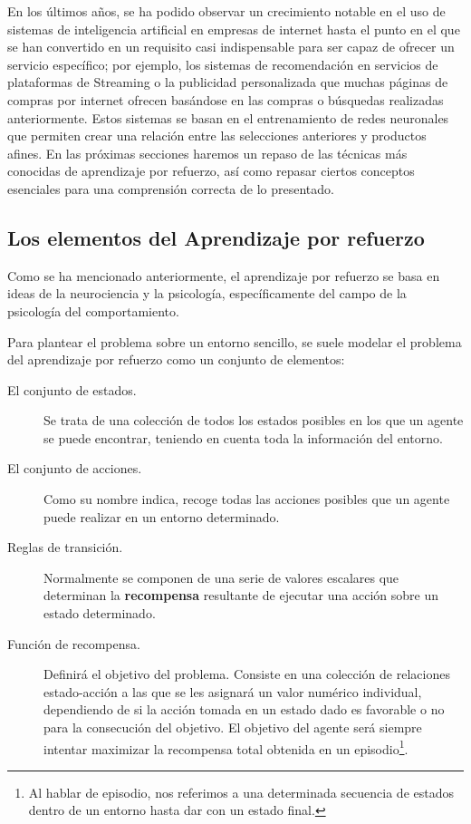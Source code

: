 \documentclass[11pt,spanish,listoffigures,listoftables]{tfgetsinf}
\begin{document}
En los últimos años, se ha podido observar un crecimiento notable en el uso de sistemas de inteligencia artificial en empresas de internet hasta el punto en el que se han convertido en un requisito casi indispensable para ser capaz de ofrecer un servicio específico; por ejemplo, los sistemas de recomendación en servicios de plataformas de Streaming o la publicidad personalizada que muchas páginas de compras por internet ofrecen basándose en las compras o búsquedas realizadas anteriormente. Estos sistemas se basan en el entrenamiento de redes neuronales que permiten crear una relación entre las selecciones anteriores y productos afines. En las próximas secciones haremos un repaso de las técnicas más conocidas de aprendizaje por refuerzo, así como repasar ciertos conceptos esenciales para una comprensión correcta de lo presentado.

\subsection{Los elementos del Aprendizaje por refuerzo}

Como se ha mencionado anteriormente, el aprendizaje por refuerzo se basa en ideas de la neurociencia y la psicología, específicamente del campo de la psicología del comportamiento. 


Para plantear el problema sobre un entorno sencillo, se suele modelar el problema del aprendizaje por refuerzo como un conjunto de elementos:

\begin{description}
	\item[El conjunto de estados.] Se trata de una colección de todos los estados posibles en los que un agente se puede encontrar, teniendo en cuenta toda la información del entorno.
	\item[El conjunto de acciones.] Como su nombre indica, recoge todas las acciones posibles que un agente puede realizar en un entorno determinado.
	\item[Reglas de transición.] Normalmente se componen de una serie de valores escalares que determinan la \textbf{recompensa} resultante de ejecutar una acción sobre un estado determinado.
	\item[Función de recompensa.] Definirá el objetivo del problema. Consiste en una colección de relaciones estado-acción a las que se les asignará un valor numérico individual, dependiendo de si la acción tomada en un estado dado es favorable o no para la consecución del objetivo. El objetivo del agente será siempre intentar maximizar la recompensa total obtenida en un episodio\footnote{Al hablar de episodio, nos referimos a una determinada secuencia de estados dentro de un entorno hasta dar con un estado final.}.
	
\end{description}
\end{document}

